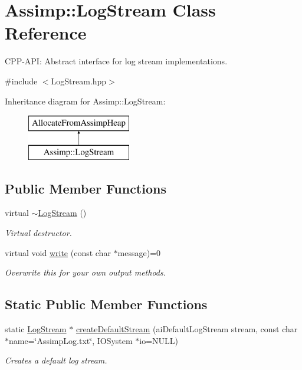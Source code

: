 \hypertarget{class_assimp_1_1_log_stream}{\section{Assimp\-:\-:Log\-Stream Class Reference}
\label{class_assimp_1_1_log_stream}
}


C\-P\-P-\/\-A\-P\-I\-: Abstract interface for log stream implementations.  




{\ttfamily \#include $<$Log\-Stream.\-hpp$>$}

Inheritance diagram for Assimp\-:\-:Log\-Stream\-:\begin{figure}[H]
\begin{center}
\leavevmode
\includegraphics[height=2.000000cm]{class_assimp_1_1_log_stream}
\end{center}
\end{figure}
\subsection*{Public Member Functions}
\begin{DoxyCompactItemize}
\item 
\hypertarget{class_assimp_1_1_log_stream_a72cabcadc78dcbdd54b5641703057ee7}{virtual \hyperlink{class_assimp_1_1_log_stream_a72cabcadc78dcbdd54b5641703057ee7}{$\sim$\-Log\-Stream} ()}\label{class_assimp_1_1_log_stream_a72cabcadc78dcbdd54b5641703057ee7}

\begin{DoxyCompactList}\small\item\em Virtual destructor. \end{DoxyCompactList}\item 
virtual void \hyperlink{class_assimp_1_1_log_stream_ab0bfcb5ab9988ef65d7222a50f6e8d37}{write} (const char $\ast$message)=0
\begin{DoxyCompactList}\small\item\em Overwrite this for your own output methods. \end{DoxyCompactList}\end{DoxyCompactItemize}
\subsection*{Static Public Member Functions}
\begin{DoxyCompactItemize}
\item 
static \hyperlink{class_assimp_1_1_log_stream}{Log\-Stream} $\ast$ \hyperlink{class_assimp_1_1_log_stream_a6b358a4a79b2e9ba2025e10d3e9405e3}{create\-Default\-Stream} (ai\-Default\-Log\-Stream stream, const char $\ast$name=\char`\"{}Assimp\-Log.\-txt\char`\"{}, I\-O\-System $\ast$io=N\-U\-L\-L)
\begin{DoxyCompactList}\small\item\em Creates a default log stream. \end{DoxyCompactList}\end{DoxyCompactItemize}
